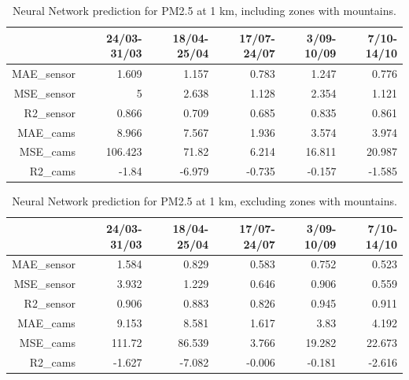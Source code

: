 \begin{table}[H]
\begin{tabular}{rrrrrr}
\hline
    &   24/03-31/03 &   18/04-25/04 &   17/07-24/07 &   3/09-10/09 &   7/10-14/10 \\
\hline
  MAE\_sensor   &            1.609 &            1.157 &            0.783 &            1.247 &            0.776 \\
 MSE\_sensor   &            5     &            2.638 &            1.128 &            2.354 &            1.121 \\
  R2\_sensor    &            0.866 &            0.709 &            0.685 &            0.835 &            0.861 \\
  MAE\_cams     &            8.966 &            7.567 &            1.936 &            3.574 &            3.974 \\
  MSE\_cams     &          106.423 &           71.82  &            6.214 &           16.811 &           20.987 \\
  R2\_cams      &           -1.84  &           -6.979 &           -0.735 &           -0.157 &           -1.585 \\
\hline
\end{tabular}
\caption{Neural Network prediction for PM2.5 at 1 km, including zones with mountains.}
\end{table}


\begin{table}[H]
\begin{tabular}{rrrrrr}
\hline
    &   24/03-31/03 &   18/04-25/04 &   17/07-24/07 &   3/09-10/09 &   7/10-14/10 \\
\hline
  MAE\_sensor   &            1.584 &            0.829 &            0.583 &            0.752 &            0.523 \\
  MSE\_sensor   &            3.932 &            1.229 &            0.646 &            0.906 &            0.559 \\
  R2\_sensor    &            0.906 &            0.883 &            0.826 &            0.945 &            0.911 \\
  MAE\_cams     &            9.153 &            8.581 &            1.617 &            3.83  &            4.192 \\
  MSE\_cams     &          111.72  &           86.539 &            3.766 &           19.282 &           22.673 \\
  R2\_cams      &           -1.627 &           -7.082 &           -0.006 &           -0.181 &           -2.616 \\
\hline
\end{tabular}
\caption{Neural Network prediction for PM2.5 at 1 km, excluding zones with mountains.}
\end{table}


